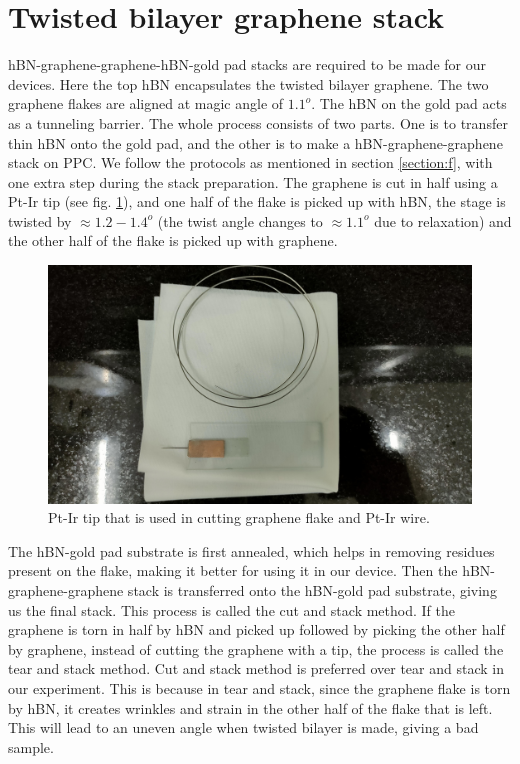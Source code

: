 \section{Twisted bilayer graphene stack}
\label{section:g}
hBN-graphene-graphene-hBN-gold pad stacks are required to be made for our devices. Here the top hBN encapsulates the twisted bilayer graphene. The two graphene flakes are aligned at magic angle of $1.1 ^o$. The hBN on the gold pad acts as a tunneling barrier. The whole process consists of two parts. One is to transfer thin hBN onto the gold pad, and the other is to make a hBN-graphene-graphene stack on PPC. We follow the protocols as mentioned in section \ref{section:f}, with one extra step during the stack preparation. The graphene is cut in half using a Pt-Ir tip (see fig. \ref{fig:tip}), and one half of the flake is picked up with hBN, the stage is twisted by $\approx1.2-1.4^o$ (the twist angle changes to $\approx 1.1^o$ due to relaxation) and the other half of the flake is picked up with graphene.

\begin{figure}[H]
	\centering
	\includegraphics[width=0.7\linewidth]{figures/tip}
	\caption{Pt-Ir tip that is used in cutting graphene flake and Pt-Ir wire.}
	\label{fig:tip}
\end{figure}

The hBN-gold pad substrate is first annealed, which helps in removing residues present on the flake, making it better for using it in our device. Then the hBN-graphene-graphene stack is transferred onto the hBN-gold pad substrate, giving us the final stack. This process is called the cut and stack method. \cite{Saito2020} If the graphene is torn in half by hBN and picked up followed by picking the other half by graphene, instead of cutting the graphene with a tip, the process is called the tear and stack method. \cite{Kim16, Cao2016} Cut and stack method is preferred over tear and stack in our experiment. This is because in tear and stack, since the graphene flake is torn by hBN, it creates wrinkles and strain in the other half of the flake that is left. This will lead to an uneven angle when twisted bilayer is made, giving a bad sample.

